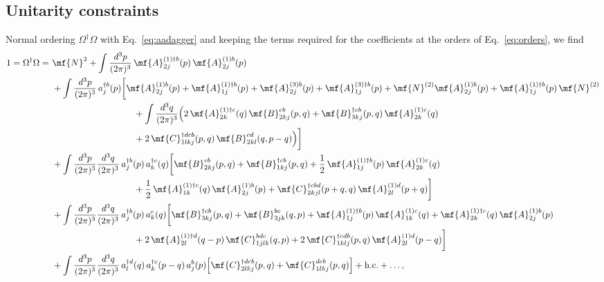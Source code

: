\subsection{Unitarity constraints}\label{subsec:unitarity}
Normal ordering $\Omega^{\dagger}\Omega$ with Eq.~\eqref{eq:aadagger} and keeping the terms required
for the coefficients at the orders of Eq.~\eqref{eq:orders}, we find
\begin{align}\label{eq:unitarity}
1=\Omega^{\dagger}\Omega=\ &\mf{N}^{2}+\int\frac{d^{3}p}{(2\pi)^{3}}\,\mf{A}^{(1)\dagger b}_{2j}(p)\,\mf{A}^{(1)b}_{2j}(p)\notag\\
&+\int\frac{d^{3}p}{(2\pi)^{3}}\,a^{\dagger b}_{j}(p)\bigg[\mf{A}^{(1)b}_{2j}(p)+\mf{A}^{(1)\dagger b}_{1j}(p)
+\mf{A}^{(3)b}_{2j}(p)+\mf{A}^{(3)\dagger b}_{1j}(p)
+\mf{N}^{(2)}\mf{A}^{(1)b}_{2j}(p)+\mf{A}^{(1)\dagger b}_{1j}(p)\,\mf{N}^{(2)}\notag\\
&\hspace{3.2cm}+\int\frac{d^{3}q}{(2\pi)^{3}}\Big(2\,\mf{A}^{(1)\dagger c}_{2k}(q)\,\mf{B}^{cb}_{2kj}(p,q)
+\mf{B}^{\dagger cb}_{3kj}(p,q)\,\mf{A}^{(1)c}_{2k}(q)\notag\\
&\hspace{3.2cm}+2\,\mf{C}^{\dagger dcb}_{1lkj}(p,q)\,\mf{B}^{cd}_{2kl}(q,p-q)\Big)\bigg]\notag\\
&+\int\frac{d^{3}p}{(2\pi)^{3}}\frac{d^{3}q}{(2\pi)^{3}}\,a^{\dagger b}_{j}(p)\,a^{\dagger c}_{k}(q)\bigg[\mf{B}^{cb}_{2kj}(p,q)+\mf{B}^{\dagger cb}_{1kj}(p,q)
+\frac{1}{2}\,\mf{A}^{(1)\dagger b}_{1j}(p)\,\mf{A}^{(1)c}_{2k}(q)\notag\\
&\hspace{3.2cm}+\frac{1}{2}\,\mf{A}^{(1)\dagger c}_{1k}(q)\,\mf{A}^{(1)b}_{2j}(p)
+\mf{C}^{\dagger cbd}_{2kjl}(p+q,q)\,\mf{A}^{(1)d}_{2l}(p+q)\bigg]\notag\\
&+\int\frac{d^{3}p}{(2\pi)^{3}}\frac{d^{3}q}{(2\pi)^{3}}\,a^{\dagger b}_{j}(p)\,a^{c}_{k}(q)\bigg[\mf{B}^{\dagger cb}_{3kj}(p,q)+\mf{B}^{bc}_{3jk}(q,p)
+\mf{A}^{(1)\dagger b}_{1j}(p)\,\mf{A}^{(1)c}_{1k}(q)+\mf{A}^{(1)\dagger c}_{2k}(q)\,\mf{A}^{(1)b}_{2j}(p)\notag\\
&\hspace{3.2cm}+2\,\mf{A}^{(1)\dagger d}_{2l}(q-p)\,\mf{C}^{bdc}_{1jlk}(q,p)
+2\,\mf{C}^{\dagger cdb}_{1klj}(p,q)\,\mf{A}^{(1)d}_{2l}(p-q)\bigg]\notag\\
&+\int\frac{d^{3}p}{(2\pi)^{3}}\frac{d^{3}q}{(2\pi)^{3}}\,a^{\dagger d}_{l}(q)\,a^{\dagger c}_{k}(p-q)\,a^{b}_{j}(p)\Big[\mf{C}^{\dagger dcb}_{2lkj}(p,q)+\mf{C}^{dcb}_{1lkj}(p,q)\Big]
+{\rm h.c.}+\dots,
\end{align}
